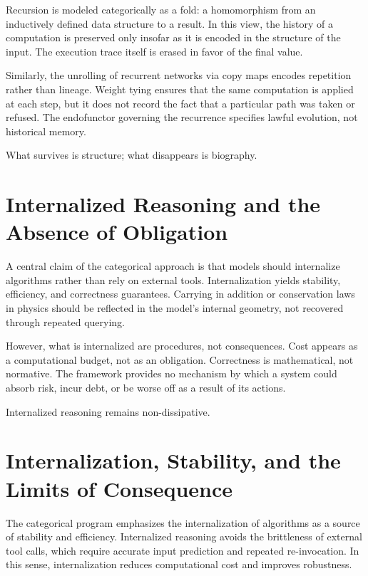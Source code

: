 \documentclass[11pt]{article}
\begin{document}
Recursion is modeled categorically as a fold: a homomorphism from an inductively
defined data structure to a result. In this view, the history of a computation
is preserved only insofar as it is encoded in the structure of the input. The
execution trace itself is erased in favor of the final value.

Similarly, the unrolling of recurrent networks via copy maps encodes repetition
rather than lineage. Weight tying ensures that the same computation is applied
at each step, but it does not record the fact that a particular path was taken
or refused. The endofunctor governing the recurrence specifies lawful evolution,
not historical memory.

What survives is structure; what disappears is biography.

\section{Internalized Reasoning and the Absence of Obligation}

A central claim of the categorical approach is that models should internalize
algorithms rather than rely on external tools. Internalization yields stability,
efficiency, and correctness guarantees. Carrying in addition or conservation
laws in physics should be reflected in the model’s internal geometry, not
recovered through repeated querying.

However, what is internalized are procedures, not consequences. Cost appears as
a computational budget, not as an obligation. Correctness is mathematical, not
normative. The framework provides no mechanism by which a system could absorb
risk, incur debt, or be worse off as a result of its actions.

Internalized reasoning remains non-dissipative. 

\section{Internalization, Stability, and the Limits of Consequence}

The categorical program emphasizes the internalization of algorithms as a source
of stability and efficiency. Internalized reasoning avoids the brittleness of
external tool calls, which require accurate input prediction and repeated
re-invocation. In this sense, internalization reduces computational cost and
improves robustness.
\end{document}
